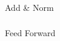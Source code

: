			



			
			
		


\begin{frame}[fragile]\frametitle{}
\begin{center}
{\Large Add \& Norm}
\end{center}
\end{frame}

\begin{frame}[fragile]\frametitle{}
\begin{center}
{\Large Feed Forward}
\end{center}
\end{frame}


			
			
		


			
